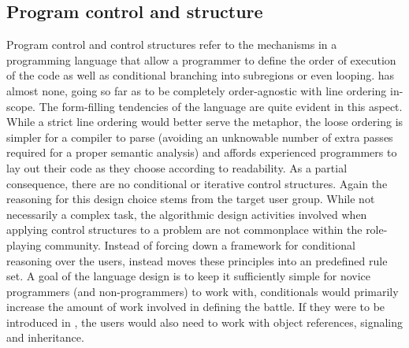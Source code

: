 \subsection{Program control and structure}
Program control and control structures refer to the mechanisms in a programming language that allow a programmer to define the order of execution of the code as well as conditional branching into subregions or even looping. \langname{} has almost none, going so far as to be completely order-agnostic with line ordering in-scope. 
The form-filling tendencies of the language are quite evident in this aspect. While a strict line ordering would better serve the metaphor, the loose ordering is simpler for a compiler to parse  (avoiding an unknowable number of extra passes required for a proper semantic analysis) and affords experienced programmers to lay out their code as they choose according to readability. As a partial consequence, there are no conditional or iterative control structures. 
Again the reasoning for this design choice stems from the target user group. While not necessarily a complex task, the algorithmic design activities involved when applying control structures to a problem are not commonplace within the role-playing community. Instead of forcing down a framework for conditional reasoning over the users, \langname{} instead moves these principles into an predefined rule set.
A goal of the language design is to keep it sufficiently simple for novice programmers (and non-programmers) to work with, conditionals would primarily increase the amount of work involved in defining the battle. If they were to be introduced in \langname{}, the users would also need to work with object references, signaling and inheritance.
